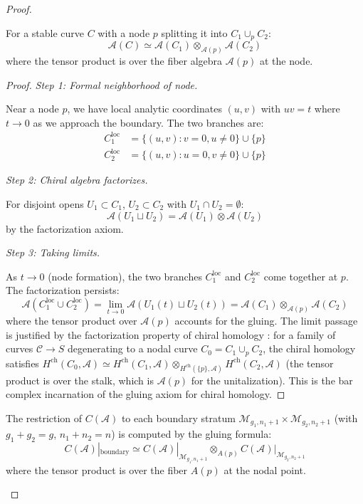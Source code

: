 \begin{proof}
\begin{proposition}\label{prop:gluing-at-nodes}
For a stable curve $C$ with a node $p$ splitting it into $C_1 \cup_p C_2$:
\[\mathcal{A}(C) \simeq \mathcal{A}(C_1) \otimes_{\mathcal{A}(p)} \mathcal{A}(C_2)\]
where the tensor product is over the fiber algebra $\mathcal{A}(p)$ at the node.
\end{proposition}

\begin{proof}
\emph{Step 1: Formal neighborhood of node.}

Near a node $p$, we have local analytic coordinates $(u,v)$ with $uv = t$ where $t \to 0$ as we approach the boundary. The two branches are:
\begin{align*}
C_1^{\text{loc}} &= \{(u, v) : v = 0, u \neq 0\} \cup \{p\} \\
C_2^{\text{loc}} &= \{(u, v) : u = 0, v \neq 0\} \cup \{p\}
\end{align*}

\emph{Step 2: Chiral algebra factorizes.}

For disjoint opens $U_1 \subset C_1$, $U_2 \subset C_2$ with $U_1 \cap U_2 = \emptyset$:
\[\mathcal{A}(U_1 \sqcup U_2) = \mathcal{A}(U_1) \otimes \mathcal{A}(U_2)\]
by the factorization axiom.

\emph{Step 3: Taking limits.}

As $t \to 0$ (node formation), the two branches $C_1^{\text{loc}}$ and $C_2^{\text{loc}}$ come together at $p$. The factorization persists:
\[\mathcal{A}(C_1^{\text{loc}} \cup C_2^{\text{loc}}) = \lim_{t \to 0} \mathcal{A}(U_1(t) \sqcup U_2(t)) = \mathcal{A}(C_1) \otimes_{\mathcal{A}(p)} \mathcal{A}(C_2)\]
where the tensor product over $\mathcal{A}(p)$ accounts for the gluing. The limit passage is justified by the factorization property of chiral homology \cite[Theorem~3.4.9]{BD04}: for a family of curves $\mathcal{C} \to S$ degenerating to a nodal curve $C_0 = C_1 \cup_p C_2$, the chiral homology satisfies $H^{\mathrm{ch}}(C_0, \mathcal{A}) \simeq H^{\mathrm{ch}}(C_1, \mathcal{A}) \otimes_{H^{\mathrm{ch}}(\{p\}, \mathcal{A})} H^{\mathrm{ch}}(C_2, \mathcal{A})$ (the tensor product is over the stalk, which is $\mathcal{A}(p)$ for the unitalization). This is the bar complex incarnation of the gluing axiom for chiral homology. \qedhere
\end{proof}

\begin{lemma}\label{lem:boundary-compatible}
The restriction of $C(\mathcal{A})$ to each boundary stratum
$\mathcal{M}_{g_1,n_1+1} \times \mathcal{M}_{g_2,n_2+1}$ (with $g_1+g_2=g$, $n_1+n_2=n$)
is computed by the gluing formula:
\[C(\mathcal{A})|_{\text{boundary}} \simeq C(\mathcal{A})|_{\mathcal{M}_{g_1,n_1+1}}
\otimes_{A(p)} C(\mathcal{A})|_{\mathcal{M}_{g_2,n_2+1}}\]
where the tensor product is over the fiber $A(p)$ at the nodal point.
\end{lemma}


\end{proof}
